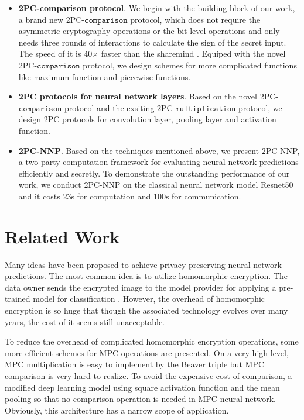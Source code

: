 \documentclass[letterpaper]{article} %
\begin{document}
    \begin{itemize}
        \item \textbf{2PC-comparison protocol}.
        We begin with the building block of our work, a brand new 2PC-$\mathtt{comparison}$ protocol,
        which does not require the asymmetric cryptography operations or the bit-level operations
        and only needs three rounds of interactions to calculate the sign of the secret input.
        The speed of it is 40$\times$ faster than the sharemind \cite{Sharemind}.
        Equiped with the novel 2PC-$\mathtt{comparison}$ protocol, we design schemes for more complicated functions
        like maximum function and piecewise functions.

        \item \textbf{2PC protocols for neural network layers}.
        Based on the novel 2PC-$\mathtt{comparison}$ protocol and the exsiting 2PC-$\mathtt{multiplication}$ protocol,
        we design 2PC protocols for convolution layer, pooling layer and activation function.

        \item \textbf{2PC-NNP}.
        Based on the techniques mentioned above,
        we present 2PC-NNP, a two-party computation framework
        for evaluating neural network predictions efficiently and secretly.
        To demonstrate the outstanding performance of our work,
        we conduct 2PC-NNP on the classical neural network model Resnet50 and
        it costs 23s for computation and 100s for communication.

    \end{itemize}






\section{Related Work}


    Many ideas have been proposed to achieve privacy preserving neural network predictions.
    The most common idea is to utilize homomorphic encryption.
    The data owner sends the encrypted image to the model provider for applying a pre-trained model for classification
    \cite{Homomorphic1} \cite{Homomorphic2}.
    However, the overhead of homomorphic encryption is so huge that though
    the associated technology evolves over many years\cite{ObliviousNeuralNetwork}, the cost of it seems still unacceptable.

    To reduce the overhead of complicated homomorphic encryption operations,
    some more efficient schemes for MPC operations are presented.
    On a very high level, MPC multiplication is easy to implement by the Beaver triple \cite{EfficientMultipartyProtocols}
    but MPC comparison is very hard to realize.
    To avoid the expensive cost of comparison,
    a modified deep learning model \cite{CryptoNets} using square activation function and the mean pooling so that
    no comparison operation is needed in MPC neural network.
    Obviously, this architecture has a narrow scope of application.
\end{document}
